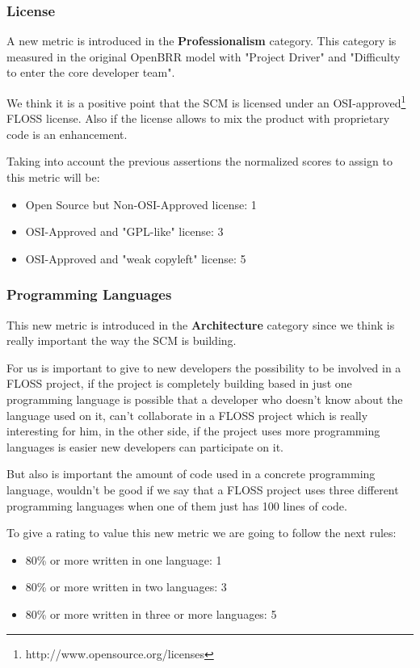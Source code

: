 \documentclass[a4paper,10pt]{article}
\begin{document}
\subsubsection{License}
\label{NewMetricEparrillae2}

A new metric is introduced in the \textbf{Professionalism} category. This category is measured in the original OpenBRR model with "Project Driver" and "Difficulty to enter the core developer team".

We think it is a positive point that the SCM is licensed under an OSI-approved\footnote{http://www.opensource.org/licenses} FLOSS license. Also if the license allows to mix the product with proprietary code is an enhancement.

Taking into account the previous assertions the normalized scores to assign to this metric will be:
\begin{itemize}
 \item Open Source but Non-OSI-Approved license: 1
 \item OSI-Approved and "GPL-like" license: 3
 \item OSI-Approved and "weak copyleft" license: 5
\end{itemize}

\subsubsection{Programming Languages} \label{Programming Languages}

This new metric is introduced in the \textbf{Architecture} category since we
think is really important the way the SCM is building.

For us is important to give to new developers the possibility to be involved in
a FLOSS project, if the project is completely building based in just one
programming language is possible that a developer who doesn't know about the
language used on it, can't collaborate in a FLOSS project which is really
interesting for him, in the other side, if the project uses more programming
languages is easier new developers can participate on it.

But also is important the amount of code used in a concrete programming
language, wouldn't be good if we say that a FLOSS project uses three different
programming languages when one of them just has 100 lines of code.

To give a rating to value this new metric we are going to follow the next rules:
\begin{itemize}
 \item 80\% or more written in one language: 1
 \item 80\% or more written in two languages: 3
 \item 80\% or more written in three or more languages: 5
\end{itemize}
\end{document}
